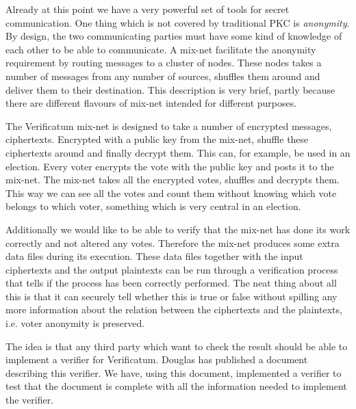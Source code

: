 Already at this point we have a very powerful set of tools for secret communication. One thing which is not covered by traditional PKC is \emph{anonymity}. By design, the two communicating parties must have some kind of knowledge of each other to be able to communicate. A mix-net facilitate the anonymity requirement by routing messages to a cluster of nodes. These nodes takes a number of messages from any number of sources, shuffles them around and deliver them to their destination. This description is very brief, partly because there are different flavours of mix-net intended for different purposes.

The Verificatum mix-net is designed to take a number of encrypted messages, ciphertexts. Encrypted with a public key from the mix-net, shuffle these ciphertexts around and finally decrypt them. This can, for example, be used in an election. Every voter encrypts the vote with the public key and posts it to the mix-net. The mix-net takes all the encrypted votes, shuffles and decrypts them. This way we can see all the votes and count them without knowing which vote belongs to which voter, something which is very central in an election.

Additionally we would like to be able to verify that the mix-net has done its work correctly and not altered any votes. Therefore the mix-net produces some extra data files during its execution. These data files together with the input ciphertexts and the output plaintexts can be run through a verification process that tells if the process has been correctly performed. The neat thing about all this is that it can securely tell whether this is true or false without spilling any more information about the relation between the ciphertexts and the plaintexts, i.e. voter anonymity is preserved.

The idea is that any third party which want to check the result should be able to implement a verifier for Verificatum. Douglas has published a document describing this verifier. We have, using this document, implemented a verifier to test that the document is complete with all the information needed to implement the verifier.
